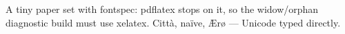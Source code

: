 \documentclass{article}
\begin{document}
A tiny paper set with fontspec: pdflatex stops on it, so the widow/orphan diagnostic build must use xelatex.
Città, naïve, Ærø — Unicode typed directly.
\end{document}
